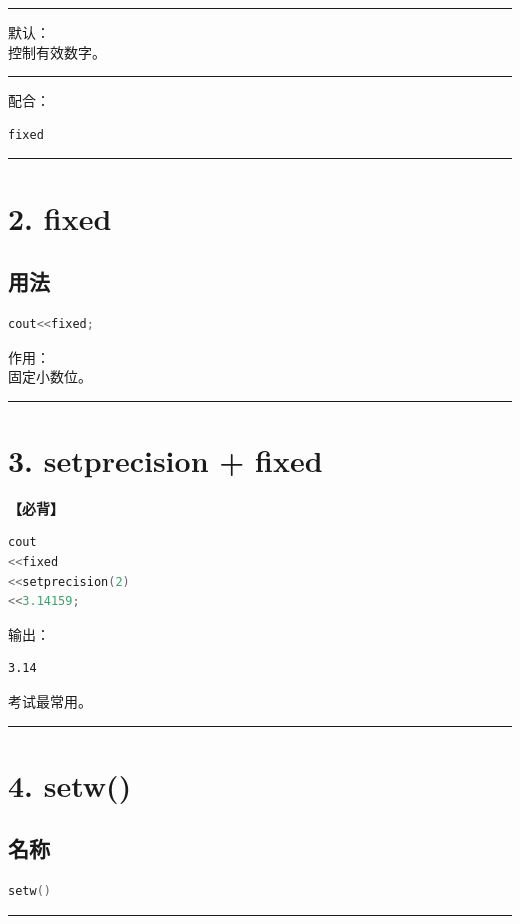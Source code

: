 \documentclass[10pt,twocolumn]{extarticle}
\begin{document}
\noindent\rule{\linewidth}{0.4pt}

默认：\\
控制有效数字。

\noindent\rule{\linewidth}{0.4pt}

配合：
\begin{lstlisting}[language=C++]
fixed
\end{lstlisting}

\noindent\rule{\linewidth}{0.4pt}

\section{2. fixed}

\subsection{用法}
\begin{lstlisting}[language=C++]
cout<<fixed;
\end{lstlisting}
作用：\\
固定小数位。

\noindent\rule{\linewidth}{0.4pt}

\section{3. setprecision + fixed}

\textbf{【必背】}

\begin{lstlisting}[language=C++]
cout
<<fixed
<<setprecision(2)
<<3.14159;
\end{lstlisting}
输出：
\begin{lstlisting}
3.14
\end{lstlisting}
考试最常用。

\noindent\rule{\linewidth}{0.4pt}

\section{4. setw()}

\subsection{名称}
\begin{lstlisting}[language=C++]
setw()
\end{lstlisting}

\noindent\rule{\linewidth}{0.4pt}
\end{document}
